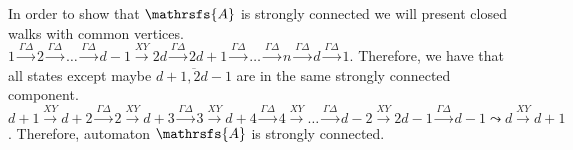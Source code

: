 \documentclass[11pt]{llncs}
\newcommand{\A}{\mathrsfs{A}}
\newcommand{\G}{\Gamma}
\newcommand{\D}{\Delta}
\begin{document}
In order to show that $\A$ is strongly connected we will present closed walks with common vertices.
$1\xrightarrow{\G\D}2\xrightarrow{\G\D}\ldots\xrightarrow{\G\D}d-1\xrightarrow{XY}2d\xrightarrow{\G\D}2d+1\xrightarrow{\G\D}\ldots
\xrightarrow{\G\D}n\xrightarrow{\G\D}d\xrightarrow{\G\D}1$. Therefore, we have that all states except maybe $\overline{d+1,2d -1}$ are in
the same strongly connected component.
$d+1\xrightarrow{XY}d+2\xrightarrow{\G\D}2\xrightarrow{XY}d+3\xrightarrow{\G\D}3\xrightarrow{XY}d+4\xrightarrow{\G\D}
4\xrightarrow{XY}\ldots\xrightarrow{\G\D}d-2\xrightarrow{XY}2d-1\xrightarrow{\G\D}d-1\leadsto d\xrightarrow{XY}d+1$. Therefore, automaton
$\A$ is strongly connected.
\end{document}
